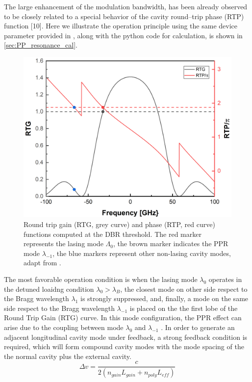 The large enhancement of the modulation bandwidth, has been already observed to be closely related to a special behavior of the cavity round–trip phase (RTP) function [10]. Here we illustrate the operation principle using the same device parameter provided in \cite{montrosset2014laser}, along with the python code for calculation, is shown in \autoref{sec:PP_resonance_cal}.
\begin{figure}[ht]
    \centering
    \includegraphics[width=.6\linewidth]{figures/PP_resonance_operation_principle.png}
    \caption{Round trip gain (RTG, grey curve) and phase (RTP, red curve) functions computed at the DBR threshold. The red marker represents the lasing mode $\Lambda_0$, the brown marker indicates the PPR mode $\lambda_{-1}$, the blue markers represent other non-lasing cavity modes, adapt from \cite{montrosset2014laser}.}
    \label{fig:PP_resonance_operation_principle}
\end{figure}

The most favorable operation condition is when the lasing mode $\lambda_0$ operates in the detuned loaidng condition $\lambda_0>\lambda_B$, the closest mode on other side respect to the Bragg wavelength $\lambda_1$ is strongly suppressed, and, finally, a mode on the same side respect to the Bragg wavelength $\lambda_{-1}$ is placed on the the first lobe of the Round Trip Gain (RTG) curve. In this mode configuration, the PPR effect can arise due to the coupling between mode $\lambda_0$ and $\lambda_{-1}$ \cite{montrosset2014laser}. In order to generate an adjacent longitudinal cavity mode under feedback, a strong feedback condition is required, which will form compound cavity modes with the mode spacing of the the normal cavity plus the external cavity.
\begin{equation}
    \Delta v=\frac{c}{2(n_{gain}L_{gain}+n_{poly}L_{eff})}
    \label{mode_spacing}
\end{equation}

